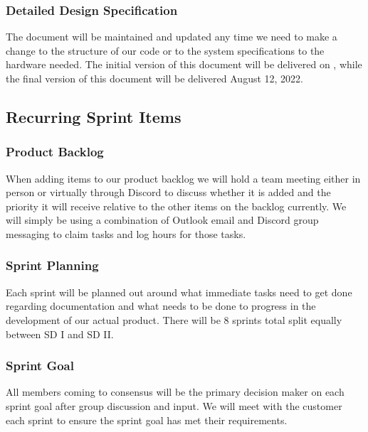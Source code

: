 \subsubsection{Detailed Design Specification}
The document will be maintained and updated any time we need to make a change to the structure of our code or to the system specifications to the hardware needed. The initial version of this document will be delivered on  , while the final version of this document will be delivered August 12, 2022.

\subsection{Recurring Sprint Items}

\subsubsection{Product Backlog}
When adding items to our product backlog we will hold a team meeting either in person or virtually through Discord to discuss whether it is added and the priority it will receive relative to the other items on the backlog currently. We will simply be using a combination of Outlook email and Discord group messaging to claim tasks and log hours for those tasks.

\subsubsection{Sprint Planning}
Each sprint will be planned out around what immediate tasks need to get done regarding documentation and what needs to be done to progress in the development of our actual product. There will be 8 sprints total split equally between SD I and SD II.

\subsubsection{Sprint Goal}
All members coming to consensus will be the primary decision maker on each sprint goal after group discussion and input. We will meet with the customer each sprint to ensure the sprint goal has met their requirements.

